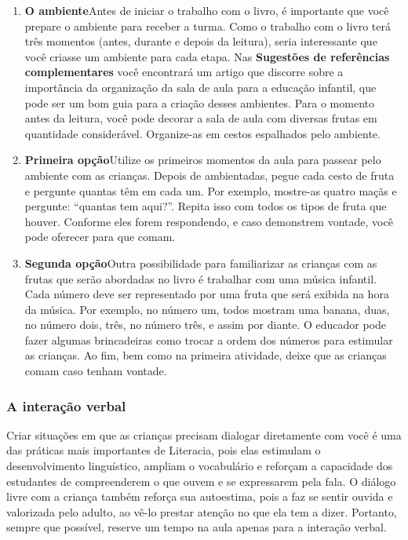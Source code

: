 \documentclass[11pt]{extarticle}
\begin{document}
\begin{enumerate}
\item \textbf{O ambiente}\quad Antes de iniciar o trabalho com o livro, é importante que você 
prepare o ambiente para receber a turma. Como o trabalho com o livro terá 
três momentos (antes, durante e depois da leitura), seria interessante que você 
criasse um ambiente para cada etapa. Nas \textbf{Sugestões de referências complementares} 
você encontrará um artigo que discorre sobre a importância da organização da sala 
de aula para a educação infantil, que pode ser um bom guia para a criação desses 
ambientes. Para o momento antes da leitura, você pode decorar a sala de aula
com diversas frutas em quantidade considerável. Organize-as em cestos
espalhados pelo ambiente. 


\item \textbf{Primeira opção}\quad Utilize os primeiros 
momentos da aula para passear pelo ambiente com as crianças.
Depois de ambientadas, pegue cada cesto de fruta e pergunte
quantas têm em cada um. Por exemplo, mostre-as quatro maçãs 
e pergunte: ``quantas tem aqui?''. Repita isso com todos
os tipos de fruta que houver. Conforme eles forem respondendo,
e caso demonstrem vontade, você pode oferecer para que comam. 

\item \textbf{Segunda opção}\quad Outra possibilidade para familiarizar 
as crianças com as frutas que serão abordadas no livro é trabalhar
com uma música infantil. Cada número deve ser representado por uma 
fruta que será exibida na hora da música. Por exemplo, no número um,
todos mostram uma banana, duas, no número dois, três, no número três,
e assim por diante. O educador pode fazer algumas brincadeiras como
trocar a ordem dos números para estimular as crianças. Ao fim, bem
como na primeira atividade, deixe que as crianças comam caso tenham vontade. 
\end{enumerate}


\subsubsection{A interação verbal} 
Criar situações em que as crianças precisam dialogar diretamente com 
você é uma das práticas mais importantes de Literacia, pois elas estimulam 
o desenvolvimento linguístico, ampliam o vocabulário e reforçam a 
capacidade dos estudantes de compreenderem o que ouvem e se expressarem 
pela fala. O diálogo livre com a criança também reforça sua autoestima, pois 
a faz se sentir ouvida e valorizada pelo adulto, ao vê-lo prestar atenção 
no que ela tem a dizer. Portanto, sempre que possível, reserve um tempo na 
aula apenas para a interação verbal. 
\end{document}
